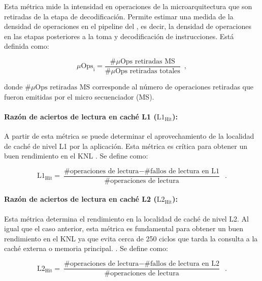 Esta métrica mide la intensidad en operaciones de la microarquitectura que son retiradas de la etapa de decodificaci\'on. Permite estimar una medida de la densidad de operaciones en el pipeline del , es decir, la densidad de operaciones en las etapas posteriores a la toma y decodificaci\'on de instrucciones. Está definida como:

\begin{equation}
\mu\text{Ops}_{\text{i}}= \frac{\text{\#}\mu\text{Ops retiradas MS}}{\text{\#}\mu\text{Ops retiradas totales}} \enspace ,
\end{equation}

donde $\text{\#}\mu\text{Ops retiradas MS}$ corresponde al n\'umero de operaciones retiradas que fueron emitidas por el micro secuenciador (MS).


\paragraph*{Raz\'on de aciertos de lectura en cach\'e L1 ($\text{L1}_{\text{Hit}}$):}

A partir de esta m\'etrica se puede determinar el aprovechamiento de la localidad de cach\'e de nivel L1 por la aplicaci\'on. Esta m\'etrica es cr\'itica para obtener un buen rendimiento en el KNL \cite{Jeffers2016315}. Se define como:

\begin{equation}
\text{L1}_{\text{Hit}} = \frac{\text{\# operaciones de lectura}-\text{\# fallos de lectura en L1}}{\text{\# operaciones de lectura}} \enspace .
\end{equation}

\paragraph*{Raz\'on de aciertos de lectura en cach\'e L2 ($\text{L2}_{\text{Hit}}$):}

Esta m\'etrica determina el rendimiento en la localidad de cach\'e de nivel L2. Al igual que el caso anterior, esta m\'etrica es fundamental para obtener un buen rendimiento en el KNL ya que evita cerca de 250 ciclos que tarda la consulta a la cach\'e externa o memoria principal. \cite{Jeffers2016315}. Se define como:

\begin{equation}
\text{L2}_{\text{Hit}} = \frac{\text{\# operaciones de lectura}-\text{\# fallos de lectura en L2}}{\text{\# operaciones de lectura}} \enspace .
\end{equation}


